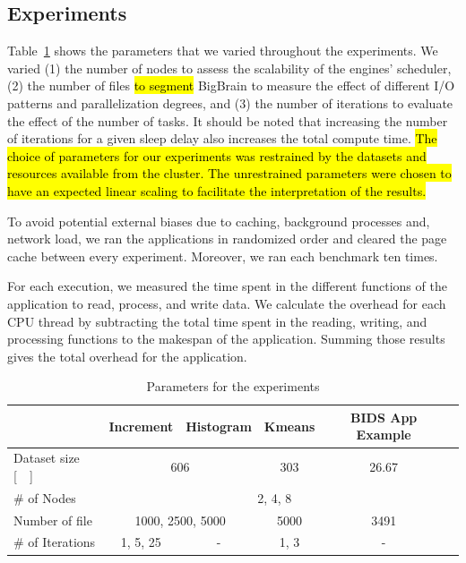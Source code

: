 \documentclass[AMA,STIX1COL]{WileyNJD-v2}
\newcommand{\HL}[1]{\hl{#1}}
\begin{document}
\subsection{Experiments}
Table~\ref{table:parameters} shows the parameters that we varied
throughout the experiments. We varied (1) the number of nodes to assess
the scalability of the engines' scheduler, (2) the number of files \HL{to segment}
BigBrain to measure the effect of different I/O patterns and parallelization degrees, and (3) the
number of iterations to evaluate the effect of the number of tasks.
It should be noted that increasing the number of iterations for a given sleep 
delay also increases the total compute time.
\HL{
	The choice of parameters for our experiments was restrained by the datasets
	and resources available from the cluster.
	The unrestrained parameters were chosen to have an expected linear scaling
	to facilitate the interpretation of the results.
}
												
To avoid potential external biases due to caching, background processes and,
network load, we ran the applications in randomized order and cleared the
page cache between every experiment.
Moreover, we ran each benchmark ten times.
												
For each execution, we measured the time spent in the different functions of the
application to read, process, and write data.
We calculate the overhead for each CPU thread by subtracting the total time
spent in the reading, writing, and processing functions to the makespan of the application.
Summing those results gives the total overhead for the application.
												
\begin{table}[t]
	\renewcommand{\arraystretch}{1.5}
	\caption{Parameters for the experiments}\label{table:parameters}
	\centering
	\begin{tabular}{|l|c|c|c|c|c|}
		\hline           & Increment & Histogram & Kmeans & BIDS App Example \\\hline
		Dataset size [\SI{}{\gibi\byte}] &\multicolumn{2}{c|}{606} & 303 & \multicolumn{1}{c|}{26.67} \\\hline
		\# of Nodes & \multicolumn{4}{c|}{2, 4, 8} \\\hline
		Number of file & \multicolumn{2}{c|}{1000, 2500, 5000} & 5000 & \multicolumn{1}{c|}{3491} \\\hline
		\# of Iterations & 1, 5, 25  & -         & 1, 3   & -                \\\hline
	\end{tabular}
\end{table}
												
\end{document}
